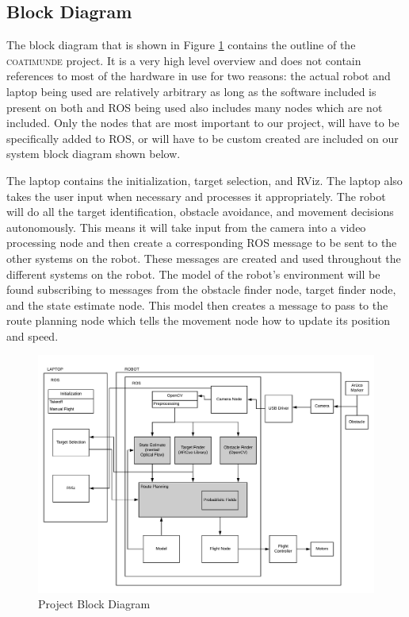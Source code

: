 \documentclass{article}
\begin{document}
	\subsection{Block Diagram}
	
	The block diagram that is shown in Figure \ref{fig:blockdiagram} contains the outline of the \textsc{coatimunde} project. It is a very high level overview and does not contain references to most of the hardware in use for two reasons: the actual robot and laptop being used are relatively arbitrary as long as the software included is present on both and ROS being used also includes many nodes which are not included. Only the nodes that are most important to our project, will have to be specifically added to ROS, or will have to be custom created are included on our system block diagram shown below.
	
	The laptop contains the initialization, target selection, and RViz. The laptop also takes the user input when necessary and processes it appropriately.  The robot will do all the target identification, obstacle avoidance, and movement decisions autonomously. This means it will take input from the camera into a video processing node and then create a corresponding ROS message to be sent to the other systems on the robot. These messages are created and used throughout the different systems on the robot. The model of the robot's environment will be found subscribing to messages from the obstacle finder node, target finder node, and the state estimate node. This model then creates a message to pass to the route planning node which tells the movement node how to update its position and speed. 

	\begin{figure}[H]
		\centering
		\includegraphics[width=0.9\linewidth]{BlockDiagram}
		\caption{Project Block Diagram}
		\label{fig:blockdiagram}
	\end{figure}
\end{document}
